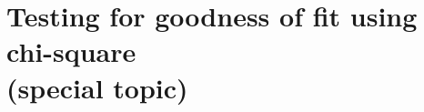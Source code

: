 %
%
%
%
%



\section[Testing for goodness of fit using chi-square (special topic)]{Testing for goodness of fit using chi-square \\(special topic)}
\label{oneWayChiSquare}

